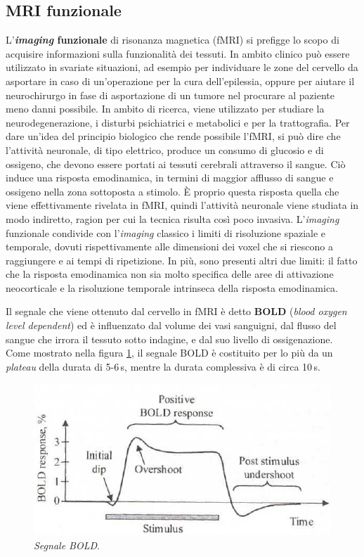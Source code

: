\documentclass{report}
\newcommand{\figref}[1]{figura \ref{#1}}
\numberwithin{equation}{section}
\numberwithin{figure}{section}
\begin{document}
\subsection{MRI funzionale}
L'\textbf{\textit{imaging} funzionale} di risonanza magnetica (fMRI) si prefigge lo scopo di acquisire informazioni sulla funzionalità dei tessuti. In ambito clinico può essere utilizzato in svariate situazioni, ad esempio per individuare le zone del cervello da asportare in caso di un'operazione per la cura dell'epilessia, oppure per aiutare il neurochirurgo in fase di asportazione di un tumore nel procurare al paziente meno danni possibile. In ambito di ricerca, viene utilizzato per studiare la neurodegenerazione, i disturbi psichiatrici e metabolici e per la trattografia. Per dare un'idea del principio biologico che rende possibile l'fMRI, si può dire che l'attività neuronale, di tipo elettrico, produce un consumo di glucosio e di ossigeno, che devono essere portati ai tessuti cerebrali attraverso il sangue. Ciò induce una risposta emodinamica, in termini di maggior afflusso di sangue e ossigeno nella zona sottoposta a stimolo. È proprio questa risposta quella che viene effettivamente rivelata in fMRI, quindi l'attività neuronale viene studiata in modo indiretto, ragion per cui la tecnica risulta così poco invasiva. L'\textit{imaging} funzionale condivide con l'\textit{imaging} classico i limiti di risoluzione spaziale e temporale, dovuti rispettivamente alle dimensioni dei voxel che si riescono a raggiungere e ai tempi di ripetizione. In più, sono presenti altri due limiti: il fatto che la risposta emodinamica non sia molto specifica delle aree di attivazione neocorticale e la risoluzione temporale intrinseca della risposta emodinamica.

Il segnale che viene ottenuto dal cervello in fMRI è detto \textbf{BOLD} (\textit{blood oxygen level dependent}) ed è influenzato dal volume dei vasi sanguigni, dal flusso del sangue che irrora il tessuto sotto indagine, e dal suo livello di ossigenazione. Come mostrato nella \figref{fig:bold}, il segnale BOLD è costituito per lo più da un \textit{plateau} della durata di 5-6\,s, mentre la durata complessiva è di circa 10\,s.

\begin{figure}[htp]
\centering
\includegraphics[scale=1.2]{immagini/bold.png}
\caption{\label{fig:bold} \textit{Segnale BOLD}.}
\end{figure}
\end{document}
